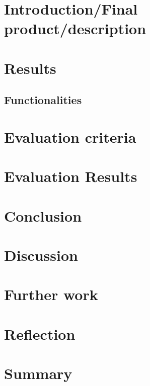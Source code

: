 \section{Introduction/Final product/description}
\section{Results}
\subsection{Functionalities}
\section{Evaluation criteria}
\section{Evaluation Results}
\section{Conclusion}
\section{Discussion}
\section{Further work}
\section{Reflection}
\section{Summary}




